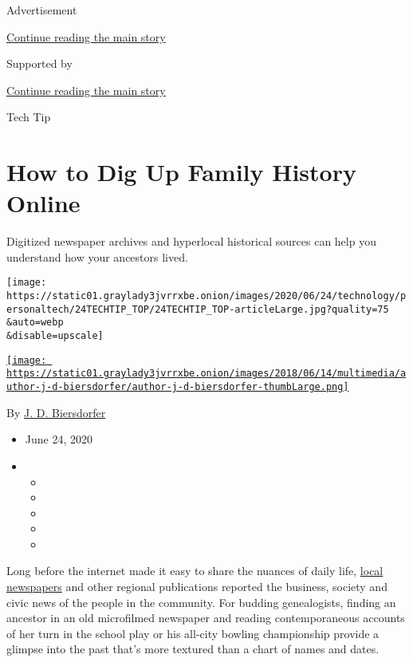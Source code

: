 Advertisement

\protect\hyperlink{after-top}{Continue reading the main story}

Supported by

\protect\hyperlink{after-sponsor}{Continue reading the main story}

Tech Tip

\hypertarget{how-to-dig-up-family-history-online}{%
\section{How to Dig Up Family History
Online}\label{how-to-dig-up-family-history-online}}

Digitized newspaper archives and hyperlocal historical sources can help
you understand how your ancestors lived.

\texttt{[image: https://static01.graylady3jvrrxbe.onion/images/2020/06/24/technology/personaltech/24TECHTIP\_TOP/24TECHTIP\_TOP-articleLarge.jpg?quality=75\\\&auto=webp\\\&disable=upscale]}

\href{https://www.nytimes3xbfgragh.onion/by/j-d-biersdorfer}{\texttt{[image: https://static01.graylady3jvrrxbe.onion/images/2018/06/14/multimedia/author-j-d-biersdorfer/author-j-d-biersdorfer-thumbLarge.png]}}

By \href{https://www.nytimes3xbfgragh.onion/by/j-d-biersdorfer}{J. D.
Biersdorfer}

\begin{itemize}
\item
  June 24, 2020
\item
  \begin{itemize}
  \item
  \item
  \item
  \item
  \item
  \end{itemize}
\end{itemize}

Long before the internet made it easy to share the nuances of daily
life,
\href{https://en.wikipedia.org/wiki/Wikipedia:List_of_online_newspaper_archives\#United_States}{local
newspapers} and other regional publications reported the business,
society and civic news of the people in the community. For budding
genealogists, finding an ancestor in an old microfilmed newspaper and
reading contemporaneous accounts of her turn in the school play or his
all-city bowling championship provide a glimpse into the past that's
more textured than a chart of names and dates.

